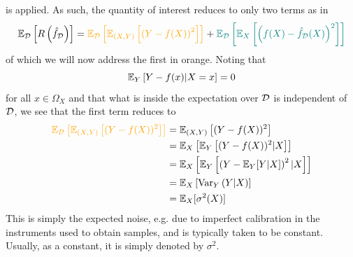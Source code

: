 \documentclass[11pt]{article}
\begin{document}
is applied. As such, the quantity of interest reduces to only two terms as in
$$
\E_{\D}\l[R\l(\hat{f}_{\D}\r)\r]
=
\textcolor{c5}{\E_{\D}\l[\E_{(X,Y)}\l[\l(Y-f(X)\r)^2\r]\r]}+\textcolor{c11}{\E_{\D}\l[\E_X\l[\l(f(X)-\hat{f}_{\D}(X)\r)^2\r]\r]}
$$
of which we will now address the first in orange. Noting that
$$
\mathbb{E}_{Y}\left[Y-f(x)|X=x\right]
=
0
$$
for all $x\in\Omega_X$ and that what is inside the expectation over $\mathcal{D}$ is independent of $\mathcal{D}$, we see that the first term reduces to
\begin{align*}
    \textcolor{c5}{\E_{\D}\l[\E_{(X,Y)}\l[(Y-f(X))^2\r]\r]}
    &=
    \E_{(X,Y)}\l[(Y-f(X))^2\r]\\
    &=
    \E_X\l[\E_Y\l[(Y-f(X))^2|X\r]\r]\\
    &=
    \E_X\l[\E_Y\l[\l(Y-\E_Y[Y|X]\r)^2|X\r]\r]\\
    &=
    \E_X\l[\text{Var}_Y\l(Y|X\r)\r]\\
    &=
    \E_X[\sigma^2(X)]
\end{align*}
This is simply the expected noise, e.g. due to imperfect calibration in the instruments used to obtain samples, and is typically taken to be constant. Usually, as a constant, it is simply denoted by $\sigma^2$.
\end{document}
